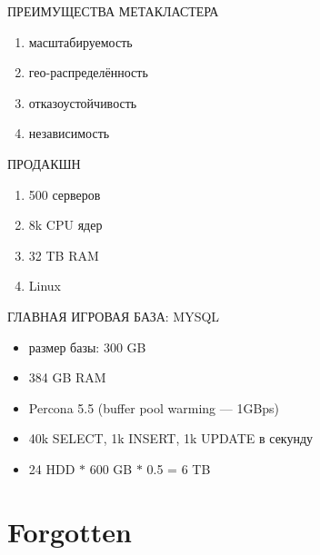 \documentclass[aspectratio=169]{beamer}
\begin{document}
\begin{frame}{ПРЕИМУЩЕСТВА МЕТАКЛАСТЕРА}
    \begin{enumerate}
        \item масштабируемость
        \item гео-распределённость
        \item отказоустойчивость
        \item независимость
    \end{enumerate}
\end{frame}

\begin{frame}{ПРОДАКШН}
    \begin{enumerate}
        \item 500 серверов
        \item 8k CPU ядер
        \item 32 TB RAM 
        \item Linux
    \end{enumerate}
\end{frame}

\begin{frame}{ГЛАВНАЯ ИГРОВАЯ БАЗА: MYSQL}
    \begin{itemize}
        \item размер базы: 300 GB
        \item 384 GB RAM
        \item Percona 5.5 (buffer pool warming --- 1GBps)
        \item 40k SELECT, 1k INSERT, 1k UPDATE в секунду
        \item 24 HDD $*$ 600 GB $*$ 0.5 = 6 TB
    \end{itemize}
\end{frame}

\section{Forgotten}
{
\begin{frame}[plain]{}
\end{frame}
}
\end{document}
